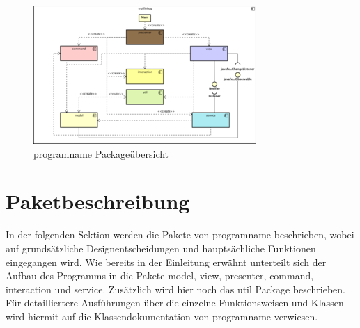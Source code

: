 \begin{figure}[H]
  \centering
  \includegraphics[width=\textwidth]{../diagramimages/trufflehog-component.png}
  \caption{\gls{programname} Packageübersicht}
\end{figure}


\section{Paketbeschreibung}

In der folgenden Sektion werden die Pakete von \gls{programname} beschrieben, wobei auf grundsätzliche Designentscheidungen und hauptsächliche Funktionen eingegangen wird. Wie bereits in der Einleitung erwähnt unterteilt sich der Aufbau des Programms in die Pakete model, view, presenter, command, interaction und service. Zusätzlich wird hier noch das util Package beschrieben. Für detailliertere Ausführungen über die einzelne Funktionsweisen und Klassen wird hiermit auf die Klassendokumentation von \gls{programname} verwiesen.















\medskip
